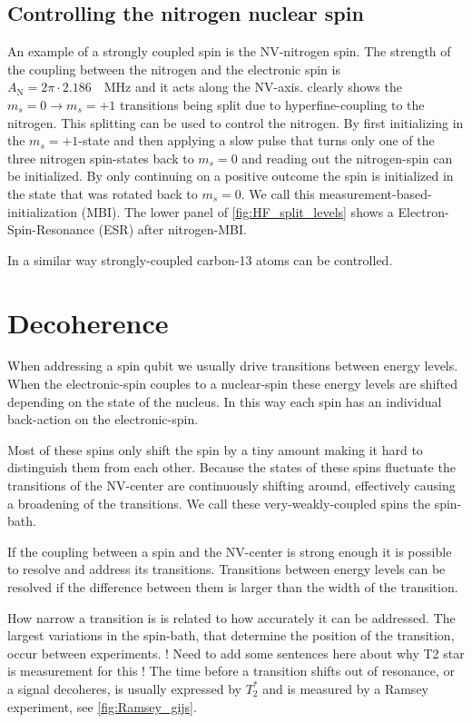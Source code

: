 \subsection{Controlling the nitrogen nuclear spin}
An example of a strongly coupled spin is the NV-nitrogen spin.
The strength of the coupling between the nitrogen and the electronic spin is $A_\mathrm{N} = 2\pi \cdot 2.186\quad \mathrm{MHz} $\citep{Bernien2014Control} and it acts along the NV-axis.
 clearly shows the $m_s =0 \rightarrow m_s=+1$ transitions being split due to hyperfine-coupling to the nitrogen.
This splitting can be used to control the nitrogen.
By first initializing in the $m_s =+1$-state and then applying a slow pulse that turns only one of the three nitrogen spin-states back to $m_s=0$ and reading out the nitrogen-spin can be initialized. By only continuing on a positive outcome the spin is initialized in the state that was rotated back to $m_s =0$. We call this measurement-based-initialization (MBI).
The lower panel of \cref{fig:HF_split_levels} shows a Electron-Spin-Resonance (ESR) after nitrogen-MBI.

In a similar way strongly-coupled carbon-13 atoms can be controlled\citep{Robledo2011HighFidelity}.

\section{Decoherence}


When addressing a spin qubit we usually drive transitions between energy levels.
When the electronic-spin couples to a nuclear-spin these energy levels are shifted depending on the state of the nucleus.
In this way each spin has an individual back-action on the electronic-spin.

Most of these spins only shift the spin by a tiny amount making it hard to distinguish them from each other.
Because the states of these spins fluctuate the transitions of the NV-center are continuously shifting around, effectively causing a broadening of the transitions.
We call these very-weakly-coupled spins the spin-bath.

If the coupling between a spin and the NV-center is strong enough it is possible to resolve and address its transitions.
Transitions between energy levels can be resolved if the difference between them is larger than the width of the transition.

How narrow a transition is is related to how accurately it can be addressed.
The largest variations in the spin-bath, that determine the position of the transition, occur between experiments.
!
Need to add some sentences here about why T2 star is measurement for this
!
The time before a transition shifts out of resonance, or a signal decoheres, is usually expressed by $T_2^*$ and is measured by a Ramsey experiment, see \cref{fig:Ramsey_gijs}.

